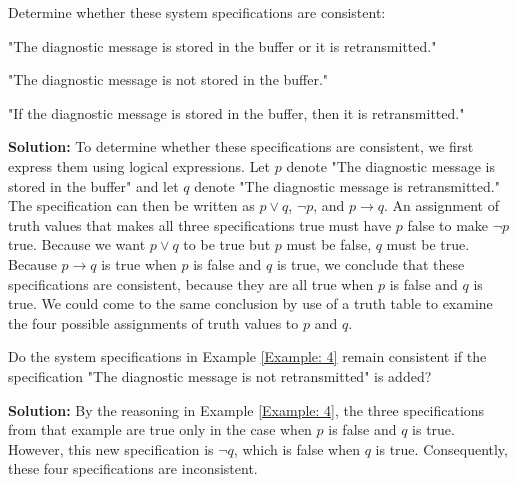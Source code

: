 \documentclass{Axon}
\begin{document}
\begin{example}\label{Example: 4}
    Determine whether these system specifications are consistent:
    \begin{center}
        "The diagnostic message is stored in the buffer or it is retransmitted."
    \end{center}
    \begin{center}
        "The diagnostic message is not stored in the buffer."
    \end{center}
    \begin{center}
        "If the diagnostic message is stored in the buffer, then it is retransmitted."
    \end{center}

    \noindent
    \textbf{Solution:}
    To determine whether these specifications are consistent, we first express them using logical expressions. Let \(p\) denote "The diagnostic message is stored in the buffer" and let \(q\) denote "The diagnostic message is retransmitted." The specification can then be written as \(p \lor q\), \(\lnot p\), and \(p \to q\). An assignment of truth values that makes all three specifications true must have \(p\) false to make \(\lnot p\) true. Because we want \(p \lor q\) to be true but \(p\) must be false, \(q\) must be true. Because \(p \to q\) is true when \(p\) is false and \(q\) is true, we conclude that these specifications are consistent, because they are all true when \(p\) is false and \(q\) is true. We could come to the same conclusion by use of a truth table to examine the four possible assignments of truth values to \(p\) and \(q\).
\end{example}

\begin{example}
    Do the system specifications in Example \ref{Example: 4} remain consistent if the specification "The diagnostic message is not retransmitted" is added?

    \noindent
    \textbf{Solution:}
    By the reasoning in Example \ref{Example: 4}, the three specifications from that example are true only in the case when \(p\) is false and \(q\) is true. However, this new specification is \(\lnot q\), which is false when \(q\) is true. Consequently, these four specifications are inconsistent.
\end{example}

\printbibliography
\end{document}
